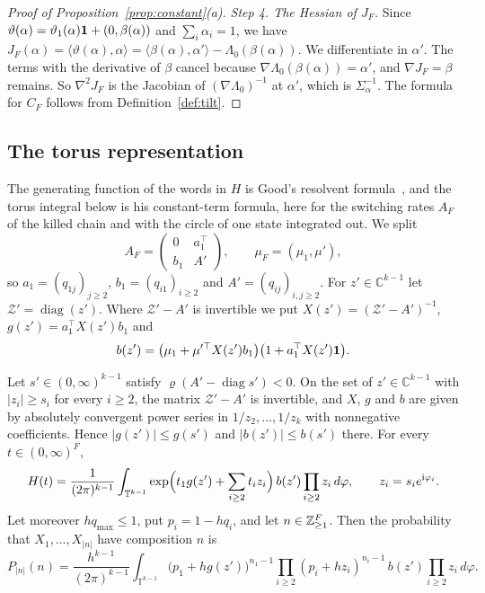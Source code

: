 \begin{proof}[Proof of Proposition~\ref{prop:constant}(a)]
\emph{Step 4. The Hessian of $J_F$.} Since
$\vartheta(\alpha)=\vartheta_1(\alpha)\mathbf{1}+(0,\beta(\alpha))$ and
$\sum_i\alpha_i=1$, we have $J_F(\alpha)=\langle\vartheta(\alpha),\alpha\rangle
=\langle\beta(\alpha),\alpha'\rangle-\Lambda_0(\beta(\alpha))$. We
differentiate in $\alpha'$. The terms with the derivative of $\beta$ cancel
because $\nabla\Lambda_0(\beta(\alpha))=\alpha'$, and $\nabla J_F=\beta$
remains. So $\nabla^2J_F$ is the Jacobian of $(\nabla\Lambda_0)^{-1}$ at
$\alpha'$, which is $\Sigma_\alpha^{-1}$. The formula for $C_F$ follows from
Definition~\ref{def:tilt}.
\end{proof}

\subsection{The torus representation}

The generating function of the words in $H$ is Good's resolvent
formula~\cite[(2)]{good1961}, and the torus integral below is his constant-term
formula, here for the switching rates $A_F$ of the killed chain and with the circle of one state
integrated out. We split
\[
A_F=\begin{pmatrix}0&a_1^\top\\ b_1&A'\end{pmatrix},\qquad
\mu_F=(\mu_1,\mu'),
\]
so $a_1=(q_{1j})_{j\ge2}$, $b_1=(q_{i1})_{i\ge2}$ and
$A'=(q_{ij})_{i,j\ge2}$. For $z'\in\mathbb C^{k-1}$ let
$\mathcal Z'=\operatorname{diag}(z')$. Where $\mathcal Z'-A'$ is invertible
we put $X(z')=(\mathcal Z'-A')^{-1}$, $g(z')=a_1^\top X(z')b_1$ and
\[
b(z')=\bigl(\mu_1+\mu'^\top X(z')b_1\bigr)\bigl(1+a_1^\top X(z')\mathbf{1}\bigr).
\]

\begin{lemma}\label{lem:torus}
Let $s'\in(0,\infty)^{k-1}$ satisfy
$\varrho(A'-\operatorname{diag}s')<0$. On the set of $z'\in\mathbb C^{k-1}$
with $|z_i|\ge s_i$ for every $i\ge2$, the matrix
$\mathcal Z'-A'$ is invertible, and $X$, $g$ and $b$ are given by absolutely
convergent power series in $1/z_2,\dots,1/z_k$ with nonnegative coefficients.
Hence $|g(z')|\le g(s')$ and
$|b(z')|\le b(s')$ there. For every $t\in(0,\infty)^F$,
\[
H(t)=\frac1{(2\pi)^{k-1}}\int_{\mathbb T^{k-1}}
\exp\Bigl(t_1g(z')+\sum_{i\ge2}t_iz_i\Bigr)\,b(z')\prod_{i\ge2}z_i\,d\varphi,
\qquad z_i=s_ie^{\mathrm i\varphi_i}.
\]
Let moreover $hq_{\max}\le1$, put $p_i=1-hq_i$, and let $n\in\mathbb{Z}_{\ge1}^F$. Then the
probability that $X_1,\dots,X_{|n|}$ have composition $n$ is
\[
P_{|n|}(n)=\frac{h^{k-1}}{(2\pi)^{k-1}}\int_{\mathbb T^{k-1}}
\bigl(p_1+hg(z')\bigr)^{n_1-1}\prod_{i\ge2}(p_i+hz_i)^{n_i-1}\,b(z')\prod_{i\ge2}z_i\,d\varphi .
\]
\end{lemma}

